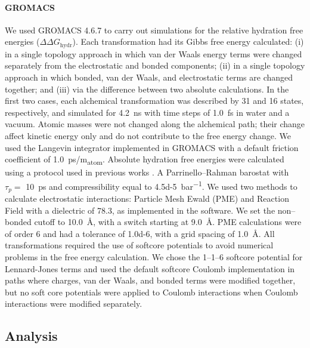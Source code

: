 \documentclass[journal=jctcce,manuscript=article]{achemso}
\begin{document}
\paragraph{GROMACS} We used GROMACS 4.6.7 to carry out simulations for 
the relative hydration free energies ($\Delta \Delta G_{\mathrm{hydr}}$).
Each transformation had its Gibbs free energy calculated: (i) in a single 
topology approach in which van der Waals energy terms were changed separately 
from the electrostatic and bonded components; (ii) in a single topology 
approach in which bonded, van der Waals, and electrostatic terms are changed 
together;  and (iii) via the difference between two absolute calculations.
In the first two cases, each alchemical transformation was described by 31 and 
16 states, respectively, and simulated for \SI{4.2}{ns} with time steps of 
\SI{1.0}{fs} in water and a vacuum. Atomic masses were not changed along the 
alchemical path;
their change affect kinetic energy only and do not contribute to the free 
energy change. We used the Langevin integrator implemented in GROMACS with a 
default friction coefficient of \SI{1.0}{ps/m_{atom}}. 
Absolute hydration free energies were calculated using a protocol used in 
previous works \cite{Mobley2014, doi:10.1021/acs.jced.7b00104}.
A Parrinello--Rahman barostat with $\tau_p =$ \SI{10}{ps} and compressibility 
equal to \SI{4.5d-5}{bar^{-1}}.
We used two methods to calculate electrostatic interactions: Particle Mesh 
Ewald (PME) and Reaction Field with a dielectric of 78.3, as implemented in the 
software. We set the non--bonded cutoff to \SI{10.0}{\angstrom}, with a switch 
starting at \SI{9.0}{\angstrom}.  PME calculations were of order 6 and had a 
tolerance of \num{1.0d-6}, with a grid spacing of \SI{1.0}{\angstrom}. 
All transformations required the use of softcore potentials to avoid numerical 
problems in the free energy calculation.  We chose the 1--1--6 softcore 
potential for Lennard-Jones terms and used the default softcore Coulomb 
implementation in paths where charges, van der Waals, and bonded terms were 
modified together, but no soft core potentials were applied to Coulomb 
interactions when Coulomb interactions were modified separately.


\subsection{Analysis}
\label{sec:analysis}
\end{document}
